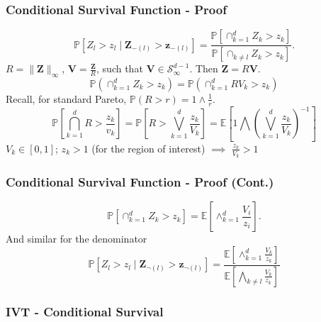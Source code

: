 \documentclass[aspectratio=169,10pt]{beamer}
\begin{document}
\begin{frame}
  \frametitle{Conditional Survival Function - Proof}
  {\small
  \begin{equation*}
    \label{eqn:condsurv1d}
    \mathbb{P}\left[Z_l > z_l\mid \bm{Z}_{-(l)} > \bm{z}_{-(l)}\right] =
      \frac{\mathbb{P}\left[\cap_{k = 1}^d Z_k > z_k\right]}{\mathbb{P}\left[\cap_{k \neq l} Z_k > z_k\right]}.
  \end{equation*}
  $R = \lVert\bm{Z}\rVert_{\infty}$, $\bm{V} = \frac{\bm{Z}}{R}$, such that
    $\bm{V}\in \mathcal{S}_{\infty}^{d-1}$.  Then $\bm{Z} = R\bm{V}$.
  \begin{equation*}
    \mathbb{P}\left(\cap_{k = 1}^d Z_k > z_k\right) = \mathbb{P}\left(\cap_{k = 1}^d RV_k > z_k\right)
  \end{equation*}
  Recall, for standard Pareto, $\mathbb{P}(R > r) = 1\wedge\frac{1}{r}$.
  \begin{equation*}
    \mathbb{P}\left[\bigcap_{k = 1}^d R > \frac{z_k}{v_k}\right] =
      \mathbb{P}\left[R  > \bigvee_{k=1}^d\frac{z_k}{V_k}\right] =
      \mathbb{E}\left[1 \bigwedge \left(\bigvee_{k = 1}^d\frac{z_k}{V_k}\right)^{-1}\right]
  \end{equation*}
  $V_k \in [0,1]$; $z_k > 1$ (for the region of interest) $\implies$ $\frac{z_k}{V_k} > 1$
  }
\end{frame}

\begin{frame}
    \frametitle{Conditional Survival Function - Proof (Cont.)}
    {\small 
  \begin{equation*}
    \mathbb{P}\left[\cap_{k = 1}^d Z_k > z_k\right] = \mathbb{E}\left[\wedge_{k = 1}^d\frac{V_i}{z_i}\right].
  \end{equation*}
  And similar for the denominator
  \begin{equation*}
    \mathbb{P}\left[Z_l > z_l\mid \bm{Z}_{\neg(l)} > \bm{z}_{\neg(l)}\right] =
      \frac{\mathbb{E}\left[\wedge_{k = 1}^d \frac{V_k}{z_k}\right]}{\mathbb{E}\left[
                \bigwedge_{k \neq l}\frac{V_k}{z_k}\right]}
  \end{equation*}
  }
\end{frame}

\subsubsection{IVT - Conditional Survival}
\end{document}
